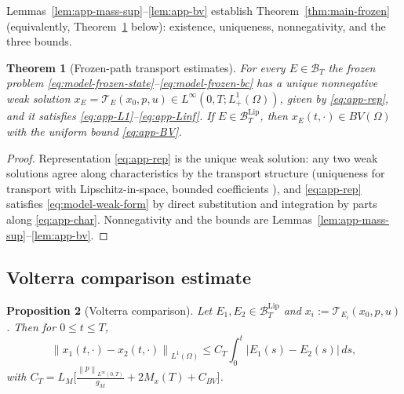 \documentclass[pdflatex,sn-mathphys-num]{sn-jnl}
\theoremstyle{thmstyleone}
\newtheorem{theorem}{Theorem}[section]
\newtheorem{proposition}[theorem]{Proposition}
\theoremstyle{definition}
\theoremstyle{remark}
\newcommand{\Om}{\Omega}
\newcommand{\Tcal}{\mathcal{T}}
\newcommand{\Bt}{\mathcal{B}_T}
\newcommand{\Btl}{\mathcal{B}_T^{\mathrm{Lip}}}
\newcommand{\norm}[1]{\left\lVert#1\right\rVert}
\newcommand{\abs}[1]{\left\lvert#1\right\rvert}
\numberwithin{equation}{section}
\begin{document}
Lemmas~\ref{lem:app-mass-sup}--\ref{lem:app-bv} establish
Theorem~\ref{thm:main-frozen} (equivalently, Theorem~\ref{thm:frozen-transport}
below): existence, uniqueness, nonnegativity, and the three bounds.

\begin{theorem}[Frozen-path transport estimates]
\label{thm:frozen-transport}
For every $E\in\Bt$ the frozen problem
\eqref{eq:model-frozen-state}--\eqref{eq:model-frozen-bc} has a unique nonnegative
weak solution $x_E=\Tcal_E(x_0,p,u)\in L^\infty(0,T;L^1_+(\Om))$, given by
\eqref{eq:app-rep}, and it satisfies \eqref{eq:app-L1}--\eqref{eq:app-Linf}. If
$E\in\Btl$, then $x_E(t,\cdot)\in BV(\Om)$ with the uniform bound
\eqref{eq:app-BV}.
\end{theorem}

\begin{proof}
Representation \eqref{eq:app-rep} is the unique weak solution: any two weak
solutions agree along characteristics by the transport structure (uniqueness for
transport with Lipschitz-in-space, bounded coefficients \cite{diperna1989ordinary}),
and
\eqref{eq:app-rep} satisfies \eqref{eq:model-weak-form} by direct substitution and
integration by parts along \eqref{eq:app-char}. Nonnegativity and the bounds are
Lemmas~\ref{lem:app-mass-sup}--\ref{lem:app-bv}.
\end{proof}

\subsection{Volterra comparison estimate}
\label{subsec:app-volterra}

\begin{proposition}[Volterra comparison]
\label{prop:volterra-transport}
Let $E_1,E_2\in\Btl$ and $x_i:=\Tcal_{E_i}(x_0,p,u)$. Then for $0\le t\le T$,
\begin{equation}
\label{eq:app-volterra}
\norm{x_1(t,\cdot)-x_2(t,\cdot)}_{L^1(\Om)}
\le
C_T\int_0^t\abs{E_1(s)-E_2(s)}\,ds,
\end{equation}
with
$\displaystyle 
C_T=L_M\Big[\tfrac{\norm{p}_{L^\infty(0,T)}}{g_M}+2M_x(T)+C_{BV}\Big]$.
\end{proposition}
\end{document}

